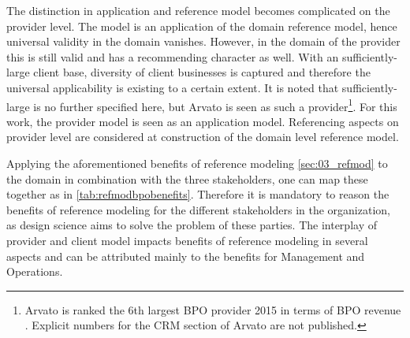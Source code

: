 The distinction in application and reference model becomes complicated on the provider level. The model is an application of the domain reference model, hence universal validity in the domain vanishes. However, in the domain of the provider this is still valid and has a recommending character as well. With an sufficiently-large client base, diversity of client businesses is captured and therefore the universal applicability is existing to a certain extent. It is noted that sufficiently-large is no further specified here, but Arvato is seen as such a provider\footnote{Arvato is ranked the 6th largest BPO provider 2015 in terms of BPO revenue \citep{hfs2016top}. Explicit numbers for the CRM section of Arvato are not published.}. For this work, the provider model is seen as an application model. Referencing aspects on provider level are considered at construction of the domain level reference model.  

Applying the aforementioned benefits of reference modeling \ref{sec:03_refmod} to the domain in combination with the three stakeholders, one can map these together as in \Tab \ref{tab:refmodbpobenefits}. Therefore it is mandatory to reason the benefits of reference modeling for the different stakeholders in the organization, as design science aims to solve the problem of these parties. The interplay of provider and client model impacts benefits of reference modeling in several aspects and can be attributed mainly to the benefits for Management and Operations.


